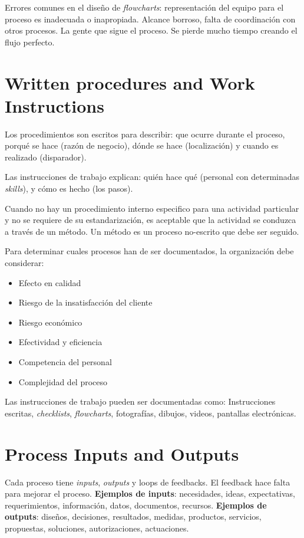 \documentclass[oneside]{book}
\begin{document}
Errores comunes en el diseño de \textit{flowcharts}: representación del equipo para el proceso es inadecuada o inapropiada. Alcance borroso, falta de coordinación con otros procesos. La gente que sigue el proceso. Se pierde mucho tiempo creando el flujo perfecto.

\section{Written procedures and Work Instructions} 

Los procedimientos son escritos para describir: que ocurre durante el proceso, porqué se hace (razón de negocio), dónde se hace (localización) y cuando es realizado (disparador).

Las instrucciones de trabajo explican: quién hace qué (personal con determinadas \textit{skills}), y cómo es hecho (los pasos). 

Cuando no hay un procedimiento interno especifico para una actividad particular y no se requiere de su estandarización, es aceptable que la actividad se conduzca a través de un método. Un método es un proceso no-escrito que debe ser seguido.

Para determinar cuales procesos han de ser documentados, la organización debe considerar: 

\begin{itemize}
	\item Efecto en calidad
	\item Riesgo de la insatisfacción del cliente
	\item Riesgo económico
	\item Efectividad y eficiencia
	\item Competencia del personal
	\item Complejidad del proceso
\end{itemize}

Las instrucciones de trabajo pueden ser documentadas como: Instrucciones escritas, \textit{checklists}, \textit{flowcharts}, fotografías, dibujos, videos, pantallas electrónicas.

\section{Process Inputs and Outputs}

Cada proceso tiene \textit{inputs}, \textit{outputs} y loops de feedbacks. El feedback hace falta para mejorar el proceso. \textbf{Ejemplos de \textbf{inputs}}: necesidades, ideas, expectativas, requerimientos, información, datos, documentos, recursos. \textbf{Ejemplos de \textbf{outputs}}: diseños, decisiones, resultados, medidas, productos, servicios, propuestas, soluciones, autorizaciones, actuaciones.
\end{document}
